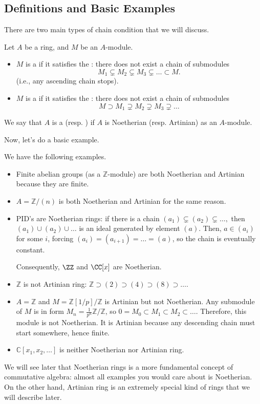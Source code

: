 \subsection{Definitions and Basic Examples}
There are two main types of chain condition
that we will discuss.
\begin{definition}
    Let $A$ be a ring, and $M$ be an $A$-module.
    \begin{itemize}
    \item $M$ is a  if it satisfies
	the :
	there does not exist a chain of submodules
	$$M_1\subsetneq M_2\subsetneq M_3\subsetneq \dots
	\subset M.$$
	(i.e., any ascending chain stops).
    \item $M$ is a  if it satisfies
	the :
	there does not exist a chain of submodules
	$$M\supset M_1\supsetneq M_2\supsetneq M_3
	\supsetneq\dots$$
    \end{itemize}
    We say that $A$ is a  
    (resp. )
    if $A$ is Noetherian (resp. Artinian) as an $A$-module.
\end{definition}
Now, let's do a basic example.
\begin{example}
  We have the following examples.
\begin{itemize}
    \item Finite abelian groups (as a $\mathbb Z$-module)
	are both Noetherian and Artinian
	because they are finite.
    \item $A=\mathbb Z/(n)$ is both
	Noetherian and Artinian for the same reason.
    \item PID's are Noetherian rings:
	if there is a chain
	$(a_1)\subsetneq (a_2)\subsetneq\dots,$
	then $(a_1)\cup (a_2)\cup \dots$ is an ideal 
        generated by element $(a)$.
        Then, $a\in (a_i)$ for some $i$, forcing 
        $(a_i) = (a_{i+1}) = \dots = (a)$, so the chain
        is eventually constant.

    Consequently, $\ZZ$ and $\CC[x]$ are Noetherian.
    \item $\mathbb Z$ is not Artinian ring:
	$\mathbb Z\supset (2)\supset (4)\supset (8)\supset\dots$.
    \item $A=\mathbb Z$ and $M=\mathbb Z[1/p]
	/\mathbb Z$ is Artinian but not Noetherian.
	Any submodule of $M$ is in form
	$M_n = \frac{1}{p^n}\mathbb Z/\mathbb Z$,
	so $0=M_0\subset M_1\subset M_2\subset\dots$.
	Therefore, this module is not Noetherian.
	It is Artinian because any descending chain
	must start somewhere, hence finite.
    \item $\mathbb C[x_1,x_2,\dots]$
	is neither Noetherian nor Artinian ring.
\end{itemize}
\end{example}
We will see later that Noetherian rings
is a more fundamental concept of commutative algebra:
almost all examples you would care about is Noetherian.
On the other hand, Artinian ring is an extremely
special kind of rings that we will describe later.
%
%
%
%
%
